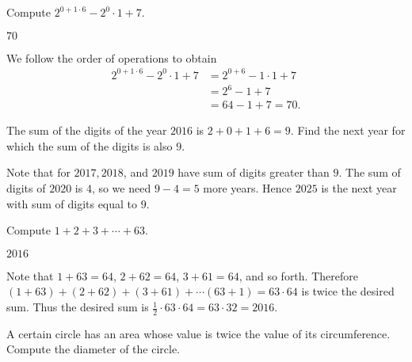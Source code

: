 \documentclass[11pt]{article}
\begin{document}
\begin{problem}
Compute $2^{0 + 1 \cdot 6} - 2^0 \cdot 1 + 7$.
\end{problem}

\begin{answer}
$\boxed{70}$
\end{answer}

\begin{solution}
We follow the order of operations to obtain \begin{align*} 2^{0 + 1 \cdot 6} - 2^0 \cdot 1 + 7 &= 2^{0 + 6} - 1 \cdot 1 + 7 \\ &= 2^6 - 1 + 7 \\ &= 64 - 1 + 7 = \boxed{70}. \end{align*}
\end{solution}


\begin{problem}
The sum of the digits of the year $2016$ is $2 + 0 + 1 + 6 = 9$. Find the next year for which the sum of the digits is also $9$.
\end{problem}

\begin{answer}
\end{answer}

\begin{solution}
Note that for $2017, 2018$, and $2019$ have sum of digits greater than $9$. The sum of digits of $2020$ is $4$, so we need $9-4 = 5$ more years. Hence $\boxed{2025}$ is the next year with sum of digits equal to $9$.
\end{solution}


\begin{problem}
Compute $1 + 2 + 3 + \cdots +  63$.
\end{problem}

\begin{answer}
$\boxed{2016}$
\end{answer}

\begin{solution}
Note that $1 + 63 = 64$, $2 + 62 = 64$, $3 + 61 = 64$, and so forth. Therefore $(1 + 63) + (2 + 62) + (3 + 61) + \cdots (63 + 1) = 63 \cdot 64$ is twice the desired sum. Thus the desired sum is $\frac{1}{2} \cdot 63 \cdot 64 = 63 \cdot 32 = \boxed{2016}$.
\end{solution}


\begin{problem}%
A certain circle has an area whose value is twice the value of its circumference. Compute the diameter of the circle.
\end{problem}
\end{document}
